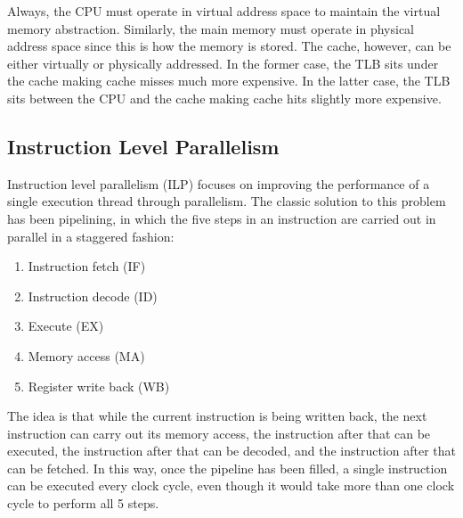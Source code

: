 \documentclass[12pt]{article}
\begin{document}
Always, the CPU must operate in virtual address space to maintain the 
virtual memory abstraction.
Similarly, the main memory must operate in physical address space since this
is how the memory is stored.
The cache, however, can be either virtually or physically addressed.
In the former case, the TLB sits under the cache making cache misses much
more expensive.
In the latter case, the TLB sits between the CPU and the cache making cache
hits slightly more expensive.

\subsection*{Instruction Level Parallelism}

Instruction level parallelism (ILP) focuses on improving the performance of
a single execution thread through parallelism.
The classic solution to this problem has been pipelining, in which
the five steps in an instruction are carried out in parallel in a staggered
fashion:
\begin{enumerate}
\item Instruction fetch (IF)
\item Instruction decode (ID)
\item Execute (EX)
\item Memory access (MA)
\item Register write back (WB)
\end{enumerate}
The idea is that while the current instruction is being written back,
the next instruction can carry out its memory access, the instruction
after that can be executed, the instruction after that can be decoded, 
and the instruction after that can be fetched.
In this way, once the pipeline has been filled, a single instruction can be
executed every clock cycle, even though it would take more than one clock
cycle to perform all 5 steps.
\end{document}
